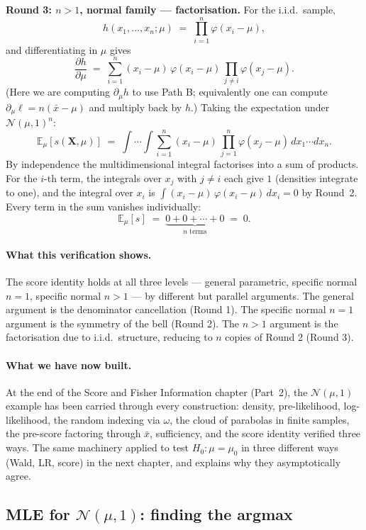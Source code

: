 \documentclass[a4paper,oneside,12pt]{extarticle}
\theoremstyle{plain}
\theoremstyle{definition}
\theoremstyle{remark}
\newcommand*{\E}{\mathbb{E}}
\begin{document}
\textbf{Round 3: $n>1$, normal family --- factorisation.}
For the i.i.d.\ sample,
\[
  h(x_1,\ldots,x_n;\mu) \;=\; \prod_{i=1}^n \varphi(x_i - \mu),
\]
and differentiating in $\mu$ gives
\[
  \frac{\partial h}{\partial\mu}
  \;=\; \sum_{i=1}^n (x_i-\mu)\,\varphi(x_i-\mu)\,\prod_{j\neq i}\varphi(x_j-\mu).
\]
(Here we are computing $\partial_\mu h$ to use Path B; equivalently
one can compute $\partial_\mu \ell = n(\bar x - \mu)$ and multiply
back by $h$.)  Taking the expectation under $\mathcal{N}(\mu,1)^n$:
\[
  \E_\mu[s(\mathbf{X},\mu)]
  \;=\; \int \cdots \int
  \sum_{i=1}^n (x_i-\mu)\,\prod_{j=1}^n \varphi(x_j-\mu)\,dx_1\cdots dx_n.
\]
By independence the multidimensional integral factorises into a sum
of products.  For the $i$-th term, the integrals over $x_j$ with
$j\neq i$ each give $1$ (densities integrate to one), and the
integral over $x_i$ is
$\int (x_i-\mu)\,\varphi(x_i-\mu)\,dx_i = 0$ by Round~2.  Every
term in the sum vanishes individually:
\[
  \E_\mu[s] \;=\; \underbrace{0 + 0 + \cdots + 0}_{n \text{ terms}}
  \;=\; 0.
\]

\paragraph{What this verification shows.}
The score identity holds at all three levels --- general parametric,
specific normal $n=1$, specific normal $n>1$ --- by different but
parallel arguments.  The general argument is the denominator
cancellation (Round 1).  The specific normal $n=1$ argument is the
symmetry of the bell (Round 2).  The $n>1$ argument is the
factorisation due to i.i.d.\ structure, reducing to $n$ copies of
Round 2 (Round 3).

\paragraph{What we have now built.}
At the end of the Score and Fisher Information chapter (Part~2), the
$\mathcal{N}(\mu, 1)$ example has been carried through every
construction: density, pre-likelihood, log-likelihood, the random
indexing via $\omega$, the cloud of parabolas in finite samples,
the pre-score factoring through $\bar x$, sufficiency, and the
score identity verified three ways.  The same machinery applied to
test $H_0: \mu = \mu_0$ in three different ways (Wald, LR, score)
in the next chapter, and explains why they asymptotically agree.


\subsection{MLE for $\mathcal{N}(\mu,1)$: finding the argmax}
\label{sec:mle_normal}
\end{document}
